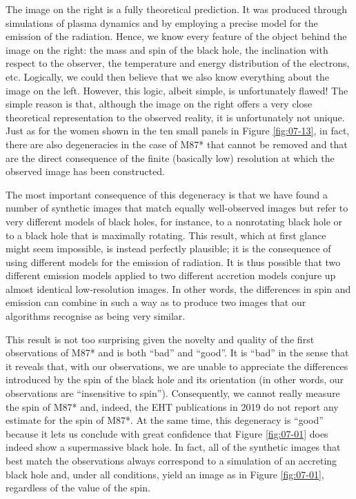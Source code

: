 The image on the right is a fully theoretical prediction. It was produced through
simulations of plasma dynamics and by employing a precise model for the emission of the
radiation. Hence, we know every feature of the object behind the image on the right: the
mass and spin of the black hole, the inclination with respect to the observer, the
temperature and energy distribution of the electrons, etc. Logically, we could then
believe that we also know everything about the image on the left. However, this logic,
albeit simple, is unfortunately flawed! The simple reason is that, although the image on
the right offers a very close theoretical representation to the observed reality, it is
unfortunately not unique. Just as for the women shown in the ten small panels in Figure
\ref{fig:07-13}, in fact, there are also degeneracies in the case of M87* that
cannot be removed and that are the direct consequence of the finite (basically low)
resolution at which the observed image has been constructed.

The most important consequence of this degeneracy is that we have
found a number of synthetic images that match equally well-observed
images but refer to very different models of black holes, for instance, to a nonrotating
black hole or to a black hole that is maximally rotating. This result, which at first
glance might seem impossible, is instead perfectly plausible; it is the consequence of
using different models for the emission of radiation. It is thus possible that two
different emission models applied to two different accretion models conjure up almost
identical low-resolution images. In other words, the differences in spin and emission
can combine in such a way as to produce two images that our algorithms recognise as
being very similar.

This result is not too surprising given the novelty and quality of the first
observations of M87* and is both ``bad'' and ``good''. It is ``bad''
in the sense that it reveals that, with our observations, we are unable to appreciate
the differences introduced by the spin of the black hole and its orientation (in other
words, our observations are ``insensitive to spin''). Consequently, we cannot really
measure the spin of M87* and, indeed, the EHT publications in 2019 do not report any
estimate for the spin of M87*. At the same time, this degeneracy is
``good'' because it lets us conclude with great confidence that Figure \ref{fig:07-01} does indeed
show a supermassive black hole. In fact, all of the synthetic images
that best match the observations always correspond to a simulation of an accreting black
hole and, under all conditions, yield an image as in Figure \ref{fig:07-01}, regardless of the value
of the spin.

